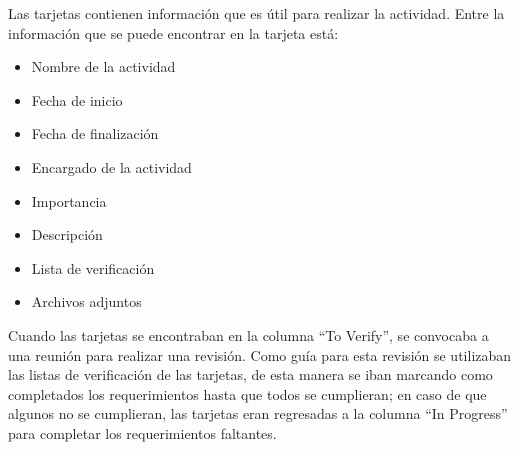 Las tarjetas contienen información que es útil para realizar la actividad. Entre la información que se puede encontrar en la tarjeta está:
    \begin{itemize}
        \item Nombre de la actividad
        \item Fecha de inicio
        \item Fecha de finalización
        \item Encargado de la actividad
        \item Importancia
        \item Descripción
        \item Lista de verificación
        \item Archivos adjuntos
    \end{itemize}

Cuando las tarjetas se encontraban en la columna ``To Verify'', se convocaba a una reunión para realizar una revisión. Como guía para esta revisión se utilizaban las listas de verificación de las tarjetas, de esta manera se iban marcando como completados los requerimientos hasta que todos se cumplieran; en caso de que algunos no se cumplieran, las tarjetas eran regresadas a la columna ``In Progress'' para completar los requerimientos faltantes.